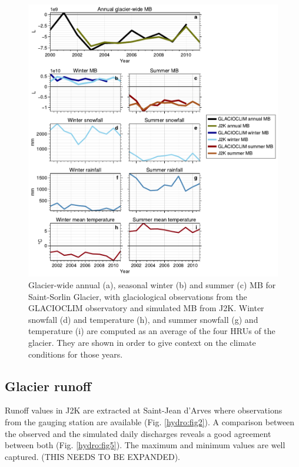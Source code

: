 \begin{figure}[h]
\centering
\includegraphics[width=15cm]{Figures/hydro/Figure_4.pdf}
\caption{Glacier-wide annual (a), seasonal winter (b) and summer (c) MB for Saint-Sorlin Glacier, with glaciological observations from the GLACIOCLIM observatory and simulated MB from J2K. Winter snowfall (d) and temperature (h), and summer snowfall (g) and temperature (i) are computed as an average of the four HRUs of the glacier. They are shown in order to give context on the climate conditions for those years.} 
\label{hydro:fig3}
\end{figure}


\subsection{Glacier runoff}

Runoff values in J2K are extracted at Saint-Jean d'Arves where observations from the gauging station are available (Fig. \ref{hydro:fig2}). A comparison between the observed and the  simulated daily discharges reveals a good agreement between both (Fig. \ref{hydro:fig5}). The maximum and minimum values are well captured. (THIS NEEDS TO BE EXPANDED).

